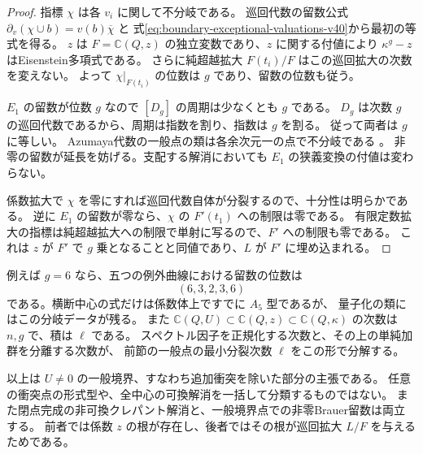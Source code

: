 \begin{proof}
指標 $\chi$ は各 $v_i$ に関して不分岐である。
巡回代数の留数公式
$\partial_v(\chi\cup b)=v(b)\overline\chi$
\cite[Proposition~5.8]{HarariBrauer40}と
式\eqref{eq:boundary-exceptional-valuations-v40}から最初の等式を得る。
$z$ は $F=\mathbb C(Q,z)$ の独立変数であり、$z$ に関する付値により
$\kappa^g-z$ はEisenstein多項式である。
さらに純超越拡大 $F(t_i)/F$ はこの巡回拡大の次数を変えない。
よって $\chi|_{F(t_i)}$ の位数は $g$ であり、留数の位数も従う。

$E_1$ の留数が位数 $g$ なので $[D_g]$ の周期は少なくとも $g$ である。
$D_g$ は次数 $g$ の巡回代数であるから、周期は指数を割り、指数は $g$ を割る。
従って両者は $g$ に等しい。
Azumaya代数の一般点の類は各余次元一の点で不分岐である
\cite[Proposition~4.23]{HarariBrauer40}。
非零の留数が延長を妨げる。支配する解消においても $E_1$ の狭義変換の付値は変わらない。

係数拡大で $\chi$ を零にすれば巡回代数自体が分裂するので、十分性は明らかである。
逆に $E_1$ の留数が零なら、$\chi$ の $F'(t_1)$ への制限は零である。
有限定数拡大の指標は純超越拡大への制限で単射に写るので、$F'$ への制限も零である。
これは $z$ が $F'$ で $g$ 乗となることと同値であり、$L$ が $F'$ に埋め込まれる。
\end{proof}

例えば $g=6$ なら、五つの例外曲線における留数の位数は
\[
 (6,3,2,3,6)
\]
である。横断中心の式だけは係数体上ですでに $A_5$ 型であるが、
量子化の類にはこの分岐データが残る。
また $\mathbb C(Q,U)\subset\mathbb C(Q,z)\subset\mathbb C(Q,\kappa)$ の次数は
$n,g$ で、積は $\ell$ である。
スペクトル因子を正規化する次数と、その上の単純加群を分離する次数が、
前節の一般点の最小分裂次数 $\ell$ をこの形で分解する。

以上は $U\ne0$ の一般境界、すなわち追加衝突を除いた部分の主張である。
任意の衝突点の形式型や、全中心の可換解消を一括して分類するものではない。
また閉点完成の非可換クレパント解消と、一般境界点での非零Brauer留数は両立する。
前者では係数 $z$ の根が存在し、後者ではその根が巡回拡大 $L/F$ を与えるためである。
